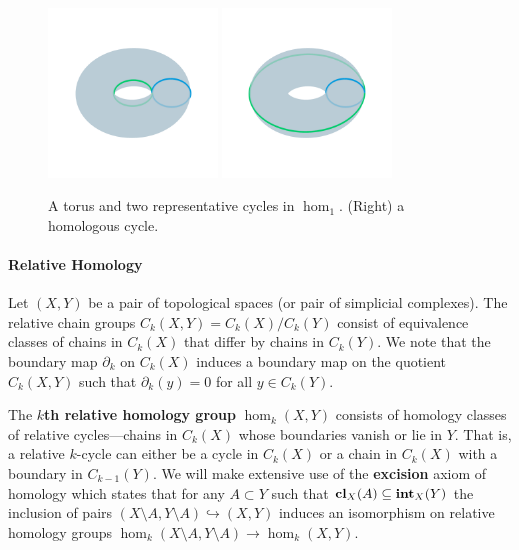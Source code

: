\begin{figure}[htbp]
  \centering
  \includegraphics[trim=0 300 0 300, clip, width=0.4\textwidth]{figures/torus1}
  \includegraphics[trim=0 300 0 300, clip, width=0.4\textwidth]{figures/torus2}
  \caption{A torus and two representative cycles in $\hom_1$. (Right) a homologous cycle.}\label{fig:torus}
\end{figure}

\paragraph{Relative Homology}

Let $(X, Y)$ be a pair of topological spaces (or pair of simplicial complexes).
The relative chain groups $C_k(X, Y) = C_k(X) / C_k(Y)$ consist of equivalence classes of chains in $C_k(X)$ that differ by chains in $C_k(Y)$.
We note that the boundary map $\partial_k$ on $C_k(X)$ induces a boundary map on the quotient $C_k(X, Y)$ such that $\partial_k(y) = 0$ for all $y\in C_k(Y)$.

The \textbf{$k$th relative homology group} $\hom_k(X, Y)$ consists of homology classes of relative cycles---chains in $C_k(X)$ whose boundaries vanish or lie in $Y$.
That is, a relative $k$-cycle can either be a cycle in $C_k(X)$ or a chain in $C_k(X)$ with a boundary in $C_{k-1}(Y)$.
We will make extensive use of the \textbf{excision} axiom of homology which states that for any $A\subset Y$ such that $\mathbf{cl}_X(A)\subseteq \mathbf{int}_X(Y)$ the inclusion of pairs $(X\setminus A, Y\setminus A)\hookrightarrow (X, Y)$ induces an isomorphism on relative homology groups $\hom_k(X\setminus A, Y\setminus A)\to\hom_k(X, Y)$.

